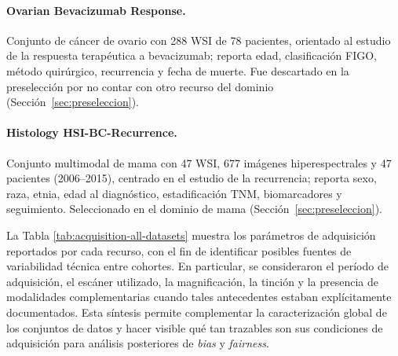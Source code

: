 \paragraph{Ovarian Bevacizumab Response.} Conjunto de cáncer de ovario con 288 WSI de 78 pacientes, orientado al estudio de la respuesta terapéutica a bevacizumab; reporta edad, clasificación FIGO, método quirúrgico, recurrencia y fecha de muerte. Fue descartado en la preselección por no contar con otro recurso del dominio \parencite{OvarianBevacizumab2022} (Sección~\ref{sec:preseleccion}).

\paragraph{Histology HSI-BC-Recurrence.} Conjunto multimodal de mama con 47 WSI, 677 imágenes hiperespectrales y 47 pacientes (2006--2015), centrado en el estudio de la recurrencia; reporta sexo, raza, etnia, edad al diagnóstico, estadificación TNM, biomarcadores y seguimiento. Seleccionado en el dominio de mama \parencite{HistologyHSIBCRecurrence2025} (Sección~\ref{sec:preseleccion}).

La Tabla \ref{tab:acquisition-all-datasets} muestra los parámetros de adquisición reportados por cada recurso, con el fin de identificar posibles fuentes de variabilidad técnica entre cohortes. En particular, se consideraron el período de adquisición, el escáner utilizado, la magnificación, la tinción y la presencia de modalidades complementarias cuando tales antecedentes estaban explícitamente documentados. Esta síntesis permite complementar la caracterización global de los conjuntos de datos y hacer visible qué tan trazables son sus condiciones de adquisición para análisis posteriores de \textit{bias} y \textit{fairness}.

